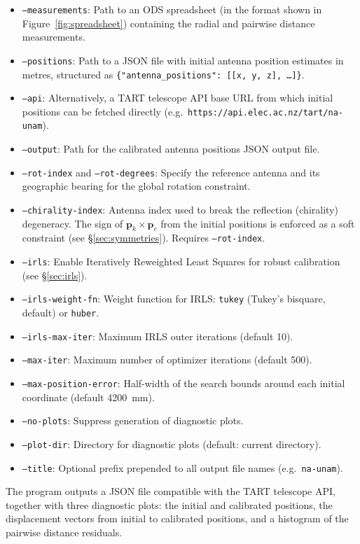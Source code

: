 \documentclass[twocolumn, a4paper,10pt]{article}
\begin{document}
\begin{itemize}
	\item \texttt{--measurements}: Path to an ODS spreadsheet (in the format shown in Figure~\ref{fig:spreadsheet}) containing the radial and pairwise distance measurements.
	\item \texttt{--positions}: Path to a JSON file with initial antenna position estimates in metres, structured as \texttt{\{"antenna\_positions": [[x, y, z], \ldots]\}}.
	\item \texttt{--api}: Alternatively, a TART telescope API base URL from which initial positions can be fetched directly (e.g.\ \texttt{https://api.elec.ac.nz/tart/na-unam}).
	\item \texttt{--output}: Path for the calibrated antenna positions JSON output file.
	\item \texttt{--rot-index} and \texttt{--rot-degrees}: Specify the reference antenna and its geographic bearing for the global rotation constraint.
	\item \texttt{--chirality-index}: Antenna index used to break the reflection (chirality) degeneracy.  The sign of $\mathbf{p}_k \times \mathbf{p}_c$ from the initial positions is enforced as a soft constraint (see \S\ref{sec:symmetries}).  Requires \texttt{--rot-index}.
	\item \texttt{--irls}: Enable Iteratively Reweighted Least Squares for robust calibration (see \S\ref{sec:irls}).
	\item \texttt{--irls-weight-fn}: Weight function for IRLS: \texttt{tukey} (Tukey's bisquare, default) or \texttt{huber}.
	\item \texttt{--irls-max-iter}: Maximum IRLS outer iterations (default 10).
	\item \texttt{--max-iter}: Maximum number of optimizer iterations (default 500).
	\item \texttt{--max-position-error}: Half-width of the search bounds around each initial coordinate (default 4200~mm).
	\item \texttt{--no-plots}: Suppress generation of diagnostic plots.
	\item \texttt{--plot-dir}: Directory for diagnostic plots (default: current directory).
	\item \texttt{--title}: Optional prefix prepended to all output file names (e.g.\ \texttt{na-unam}).
\end{itemize}

The program outputs a JSON file compatible with the TART telescope API, together with three diagnostic plots: the initial and calibrated positions, the displacement vectors from initial to calibrated positions, and a histogram of the pairwise distance residuals.
\end{document}
